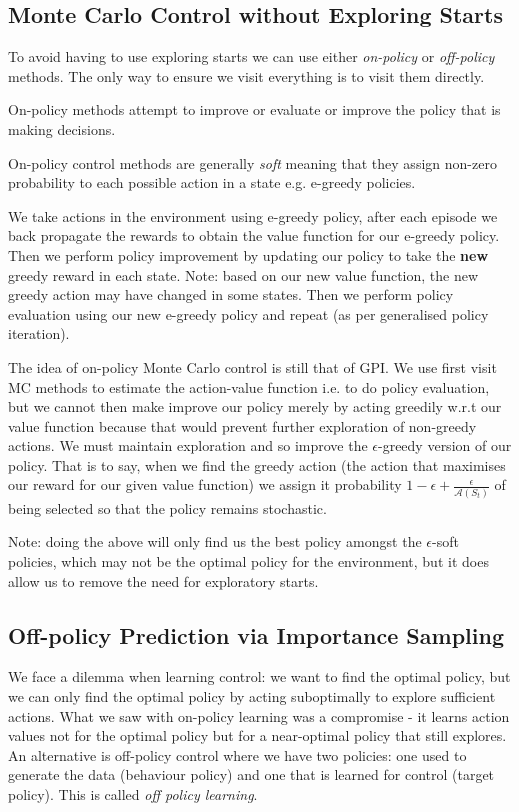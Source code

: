 \subsection{Monte Carlo Control without Exploring Starts}
\item To avoid having to use exploring starts we can use either \textit{on-policy} or \textit{off-policy} methods. The only way to ensure we visit everything is to visit them directly.
\item On-policy methods attempt to improve or evaluate or improve the policy that is making decisions.
\item On-policy control methods are generally \textit{soft} meaning that they assign non-zero probability to each possible action in a state e.g. e-greedy policies.
\item We take actions in the environment using e-greedy policy, after each episode we back propagate the rewards to obtain the value function for our e-greedy policy. Then we perform policy improvement by updating our policy to take the \textbf{new} greedy reward in each state. Note: based on our new value function, the new greedy action may have changed in some states. Then we perform policy evaluation using our new e-greedy policy and repeat (as per generalised policy iteration).
\item The idea of on-policy Monte Carlo control is still that of GPI. We use first visit MC methods to estimate the action-value function i.e. to do policy evaluation, but we cannot then make improve our policy merely by acting greedily w.r.t our value function because that would prevent further exploration of non-greedy actions. We must maintain exploration and so improve the $\epsilon$-greedy version of our policy. That is to say, when we find the greedy action (the action that maximises our reward for our given value function) we assign it probability $1 - \epsilon + \frac{\epsilon}{\mathcal{A}(S_t)}$ of being selected so that the policy remains stochastic.
\item Note: doing the above will only find us the best policy amongst the $\epsilon$-soft policies, which may not be the optimal policy for the environment, but it does allow us to remove the need for exploratory starts.


\subsection{Off-policy Prediction via Importance Sampling}
We face a dilemma when learning control: we want to find the optimal policy, but we can only find the optimal policy by acting suboptimally to explore sufficient actions. What we saw with on-policy learning was a compromise - it learns action values not for the optimal policy but for a near-optimal policy that still explores. An alternative is off-policy control where we have two policies: one used to generate the data (behaviour policy) and one that is learned for control (target policy). This is called \textit{off policy learning}.

